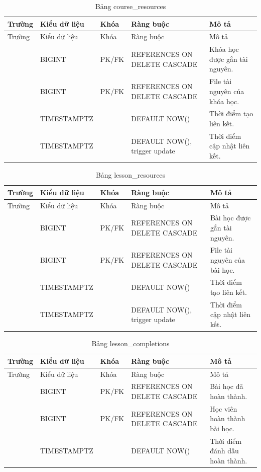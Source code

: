 \documentclass[12pt,a4paper]{report}
\begin{document}
\begin{longtable}{L{2.35cm} L{2.1cm} L{1.15cm} L{3.25cm} L{4.85cm}}
\caption{Bảng course\_resources}\label{tab:db-course-resources}\\
\toprule
Trường & Kiểu dữ liệu & Khóa & Ràng buộc & Mô tả \\
\midrule
\endfirsthead\toprule Trường & Kiểu dữ liệu & Khóa & Ràng buộc & Mô tả \\\midrule\endhead
{} & BIGINT & PK/FK & REFERENCES  ON DELETE CASCADE & Khóa học được gắn tài nguyên. \\
 & BIGINT & PK/FK & REFERENCES  ON DELETE CASCADE & File tài nguyên của khóa học. \\
 & TIMESTAMPTZ & & DEFAULT NOW() & Thời điểm tạo liên kết. \\
 & TIMESTAMPTZ & & DEFAULT NOW(), trigger update & Thời điểm cập nhật liên kết. \\

\bottomrule
\end{longtable}

\begin{longtable}{L{2.35cm} L{2.1cm} L{1.15cm} L{3.25cm} L{4.85cm}}
\caption{Bảng lesson\_resources}\label{tab:db-lesson-resources}\\
\toprule
Trường & Kiểu dữ liệu & Khóa & Ràng buộc & Mô tả \\
\midrule
\endfirsthead\toprule Trường & Kiểu dữ liệu & Khóa & Ràng buộc & Mô tả \\\midrule\endhead
{} & BIGINT & PK/FK & REFERENCES  ON DELETE CASCADE & Bài học được gắn tài nguyên. \\
 & BIGINT & PK/FK & REFERENCES  ON DELETE CASCADE & File tài nguyên của bài học. \\
 & TIMESTAMPTZ & & DEFAULT NOW() & Thời điểm tạo liên kết. \\
 & TIMESTAMPTZ & & DEFAULT NOW(), trigger update & Thời điểm cập nhật liên kết. \\

\bottomrule
\end{longtable}

\begin{longtable}{L{2.35cm} L{2.1cm} L{1.15cm} L{3.25cm} L{4.85cm}}
\caption{Bảng lesson\_completions}\label{tab:db-lesson-completions}\\
\toprule
Trường & Kiểu dữ liệu & Khóa & Ràng buộc & Mô tả \\
\midrule
\endfirsthead\toprule Trường & Kiểu dữ liệu & Khóa & Ràng buộc & Mô tả \\\midrule\endhead
{} & BIGINT & PK/FK & REFERENCES  ON DELETE CASCADE & Bài học đã hoàn thành. \\
 & BIGINT & PK/FK & REFERENCES  ON DELETE CASCADE & Học viên hoàn thành bài học. \\
 & TIMESTAMPTZ & & DEFAULT NOW() & Thời điểm đánh dấu hoàn thành. \\

\bottomrule
\end{longtable}
\end{document}
